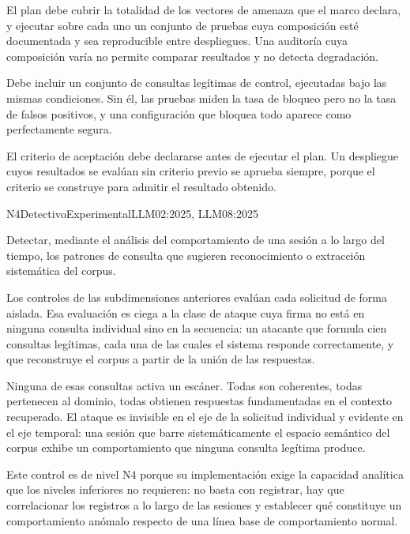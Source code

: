 El plan debe cubrir la totalidad de los vectores de amenaza que el marco declara, y ejecutar sobre cada uno un conjunto de pruebas cuya composición esté documentada y sea reproducible entre despliegues. Una auditoría cuya composición varía no permite comparar resultados y no detecta degradación.

Debe incluir un conjunto de consultas legítimas de control, ejecutadas bajo las mismas condiciones. Sin él, las pruebas miden la tasa de bloqueo pero no la tasa de falsos positivos, y una configuración que bloquea todo aparece como perfectamente segura.

El criterio de aceptación debe declararse antes de ejecutar el plan. Un despliegue cuyos resultados se evalúan sin criterio previo se aprueba siempre, porque el criterio se construye para admitir el resultado obtenido.


  {N4}{Detectivo}{Experimental}{LLM02:2025, LLM08:2025}

Detectar, mediante el análisis del comportamiento de una sesión a lo largo del tiempo, los patrones de consulta que sugieren reconocimiento o extracción sistemática del corpus.

Los controles de las subdimensiones anteriores evalúan cada solicitud de forma aislada. Esa evaluación es ciega a la clase de ataque cuya firma no está en ninguna consulta individual sino en la secuencia: un atacante que formula cien consultas legítimas, cada una de las cuales el sistema responde correctamente, y que reconstruye el corpus a partir de la unión de las respuestas.

Ninguna de esas consultas activa un escáner. Todas son coherentes, todas pertenecen al dominio, todas obtienen respuestas fundamentadas en el contexto recuperado. El ataque es invisible en el eje de la solicitud individual y evidente en el eje temporal: una sesión que barre sistemáticamente el espacio semántico del corpus exhibe un comportamiento que ninguna consulta legítima produce.

Este control es de nivel N4 porque su implementación exige la capacidad analítica que los niveles inferiores no requieren: no basta con registrar, hay que correlacionar los registros a lo largo de las sesiones y establecer qué constituye un comportamiento anómalo respecto de una línea base de comportamiento normal.

